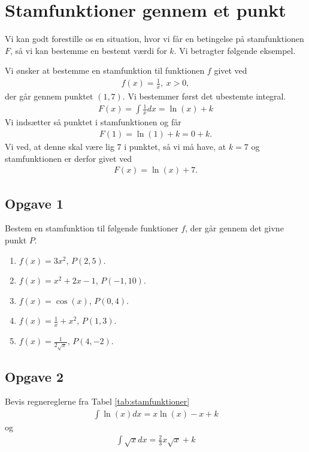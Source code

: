 \section*{Stamfunktioner gennem et punkt}
Vi kan godt forestille os en situation, hvor vi får en betingelse på stamfunktionen $F$, så vi kan bestemme en bestemt 
værdi for $k$. Vi betragter følgende eksempel.

\begin{exa}
	Vi ønsker at bestemme en stamfunktion til funktionen $f$ givet ved
	\begin{align*}
		f(x) = \frac{1}{x}, \ x > 0,
	\end{align*}
	der går gennem punktet $(1,7)$. Vi bestemmer først det ubestemte integral.
	\begin{align*}
		F(x) = \int \frac{1}{x} dx = \ln(x) + k
	\end{align*}
	Vi indsætter så punktet i stamfunktionen og får
	\begin{align*}
		F(1) = \ln(1) + k = 0 + k.
	\end{align*}
	Vi ved, at denne skal være lig $7$ i punktet, så vi må have, at $k = 7$ og stamfunktionen er derfor givet ved
	\begin{align*}
		F(x) = \ln(x) + 7.
	\end{align*}
\end{exa}

\newpage

\subsection*{Opgave 1}
Bestem en stamfunktion til følgende funktioner $f$, der går gennem det givne punkt $P$. 
\begin{enumerate}[label=\roman*)]
	\item $f(x) = 3x^2$, $P(2,5)$.
	\item $f(x) = x^2 + 2x - 1$, $P(-1, 10)$.
	\item $f(x) = \cos(x)$, $P(0,4)$.
	\item $f(x) = \frac{1}{x}+x^2$, $P(1,3)$.
	\item $f(x) = \frac{1}{2\sqrt{x}}$, $P(4,-2)$.
\end{enumerate}

\subsection*{Opgave 2}
Bevis regnereglerne fra Tabel \ref{tab:stamfunktioner}
\begin{align*}
	\int \ln(x) dx = x\ln(x) - x + k
\end{align*}
og 
\begin{align*}
	\int \sqrt{x} dx = \frac{2}{3}x\sqrt{x} + k 
\end{align*}
